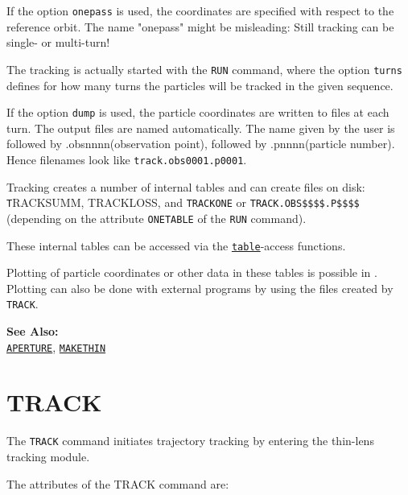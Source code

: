 If the option \texttt{onepass} is used, the coordinates are specified
with respect to the reference orbit. The name "onepass" might be
misleading: Still tracking can be single- or multi-turn!   
            
The tracking is actually started with the \texttt{RUN} command, where
the option \texttt{turns} defines for how many turns the particles will
be tracked in the given sequence. 
          
If the option \texttt{dump} is used, the particle coordinates are
written to files at each turn. The output files are named
automatically. The name given by the user is followed by
.obsnnnn(observation point), followed by .pnnnn(particle number). Hence
filenames look like \texttt{track.obs0001.p0001}.  

Tracking creates a number of internal tables and can create files on disk: 
{\texttt TRACKSUMM, TRACKLOSS}, and \texttt{TRACKONE} or
\texttt{TRACK.OBS\$\$\$\$.P\$\$\$\$} (depending on the attribute
\texttt{ONETABLE} of the \texttt{RUN} command).

These internal tables can be accessed via the
\href{../Introduction/expression.html#table}{\texttt{table}}-access
functions.      

Plotting of particle coordinates or other data in these tables is
possible in \madx. Plotting can also be done with external programs by
using the files created by \texttt{TRACK}.  

{\bf See Also:}\\
\href{../Introduction/aperture.html}{\texttt{APERTURE}}, 
\href{../makethin/makethin.html}{\texttt{MAKETHIN}}



\section{TRACK}
\label{sec:track}

The \texttt{TRACK} command initiates trajectory tracking by entering the 
thin-lens tracking module. 


The attributes of the TRACK command are:

